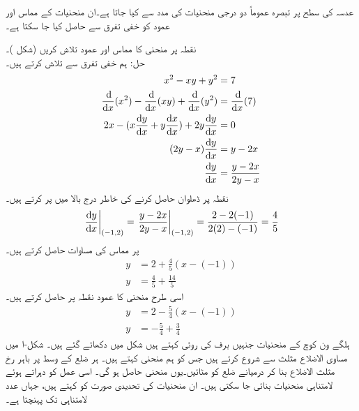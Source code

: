 عدسہ کی سطح پر تبصرہ عموماً دو درجی منحنیات کی مدد سے کیا جاتا ہے۔ان منحنیات کے مماس اور عمود کو خفی تفرق سے حاصل کیا جا سکتا ہے۔

نقطہ  پر منحنی  کا مماس اور عمود تلاش کریں (شکل )۔\\
حل:\quad
ہم خفی تفرق سے  تلاش کرتے ہیں۔
\begin{align*}
x^2-xy+y^2&=7\\
\frac{\dif}{\dif x}(x^2)-\frac{\dif}{\dif x}(xy)+\frac{\dif}{\dif x}(y^2)&=\frac{\dif}{\dif x}(7)\\
2x-(x\frac{\dif y}{\dif x}+y\frac{\dif x}{\dif x})+2y\frac{\dif y}{\dif x}&=0\\
(2y-x)\frac{\dif y}{\dif x}&=y-2x\\
\frac{\dif y}{\dif x}&=\frac{y-2x}{2y-x}
\end{align*}
نقطہ  پر ڈھلوان حاصل کرنے کی خاطر درج بالا میں  پر کرتے ہیں۔
\begin{align*}
\left.\frac{\dif y}{\dif x}\right|_{(-1,2)}=\left. \frac{y-2x}{2y-x}\right|_{(-1,2)}=\frac{2-2(-1)}{2(2)-(-1)}=\frac{4}{5}
\end{align*}
 پر مماس کی مساوات حاصل کرتے ہیں۔
\begin{align*}
y&=2+\frac{4}{5}(x-(-1))\\
y&=\frac{4}{5}+\frac{14}{5}
\end{align*}
اسی طرح منحنی کا عمود نقطہ  پر حاصل کرتے ہیں۔
\begin{align*}
y&=2-\frac{5}{4}(x-(-1))\\
y&=-\frac{5}{4}+\frac{3}{4}
\end{align*}
ہلگے ون کوچ کے منحنیات جنہیں  برف کی روئی کہتے ہیں شکل  میں دکھائے گئے ہیں۔ شکل-ا میں مساوی الاضلاع مثلث سے شروع کرتے ہیں جس کو ہم منحنی  کہتے ہیں۔ ہر ضلع کے وسط پر باہر رخ مثلث الاضلاع بنا کر درمیانے  ضلع کو مٹائیں۔یوں منحنی  حاصل ہو گی۔ اسی عمل کو دہراتے ہوئے لامتناہی منحنیات بنائی جا سکتی ہیں۔ ان منحنیات کی تحدیدی صورت  کو  کہتے ہیں، جہاں عدد  لامتناہی تک پہنچتا ہے۔
